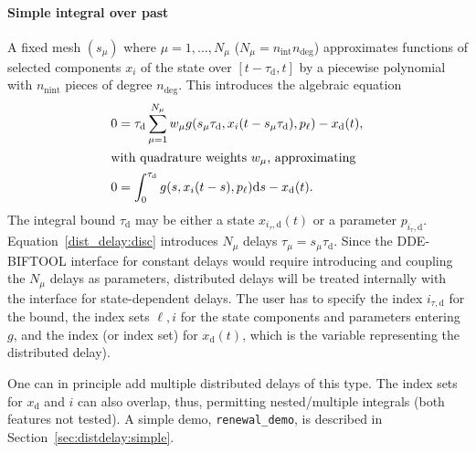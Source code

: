 \documentclass[10pt]{scrartcl}
\newcommand{\DDEBIFCODE}{\textsc{DDE-BIFTOOL}}
\renewcommand{\d}{\mathrm{d}}
\newcommand{\blist}[1]{\mbox{\lstinline!#1!}}
\begin{document}
\paragraph{Simple integral over past}
A fixed mesh $(s_\mu)$ where $\mu=1,\ldots,N_\mu$
($N_\mu=n_\mathrm{int}n_\mathrm{deg}$) approximates functions of selected
components $x_i$ of the state over $[t-\tau_\mathrm{d},t]$ by a
piecewise polynomial with $n_\mathrm{nint}$ pieces of degree
$n_\mathrm{deg}$. This introduces the algebraic equation
\begin{align}
  \label{dist_delay:disc}
  0&=\tau_\mathrm{d}\sum_{\mu=1}^{N_\mu}w_\mu g(s_\mu\tau_\mathrm{d},x_i(t-s_\mu\tau_\mathrm{d}),p_\ell)-x_\mathrm{d}(t),\\
  \intertext{with quadrature weights $w_\mu$, approximating}
    0&=\int_0^{\tau_\mathrm{d}} g(s,x_i(t-s),p_\ell)\d s-x_\mathrm{d}(t).\label{dist_delay:simple}
\end{align}
The integral bound $\tau_\mathrm{d}$ may be either a state
$x_{i_\tau,\mathrm{d}}(t)$ or a parameter
$p_{i_\tau,\mathrm{d}}$. Equation~\eqref{dist_delay:disc} introduces
$N_\mu$ delays $\tau_\mu=s_\mu\tau_\mathrm{d}$. Since the
{\DDEBIFCODE} interface for constant delays would require introducing
and coupling the $N_\mu$ delays as parameters, distributed delays will
be treated internally with the interface for state-dependent
delays. The user has to specify the index $i_{\tau,\mathrm{d}}$ for the bound, the
index sets $\ell,i$ for the state components and parameters entering $g$, and the index (or index set) for
$x_\mathrm{d}(t)$, which is the variable representing the distributed
delay).

One can in principle add multiple distributed delays of this type. The
index sets for $x_\mathrm{d}$ and $i$ can also overlap, thus,
permitting nested/multiple integrals (both features not tested). A
simple demo, \blist{renewal_demo}, is described in
Section~\ref{sec:distdelay:simple}.
\end{document}
